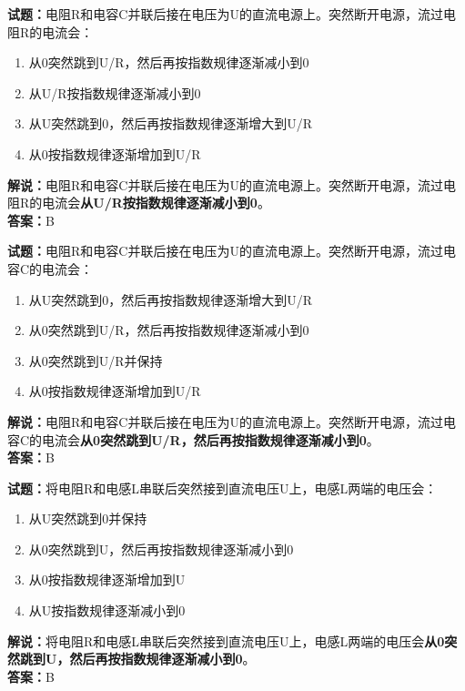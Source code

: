 \documentclass{ctexbook}
\begin{document}
\bigskip


\noindent\textbf{试题：}电阻R和电容C并联后接在电压为U的直流电源上。突然断开电源，流过电阻R的电流会：
\begin{enumerate}[leftmargin=3em]
\item 从0突然跳到U/R，然后再按指数规律逐渐减小到0
\item 从U/R按指数规律逐渐减小到0
\item 从U突然跳到0，然后再按指数规律逐渐增大到U/R
\item 从0按指数规律逐渐增加到U/R
\end{enumerate}
\noindent\textbf{解说：}电阻R和电容C并联后接在电压为U的直流电源上。突然断开电源，流过电阻R的电流会\textbf{从U/R按指数规律逐渐减小到0}。\\\noindent\textbf{答案：}B




\bigskip


\noindent\textbf{试题：}电阻R和电容C并联后接在电压为U的直流电源上。突然断开电源，流过电容C的电流会：
\begin{enumerate}[leftmargin=3em]
\item 从U突然跳到0，然后再按指数规律逐渐增大到U/R
\item 从0突然跳到U/R，然后再按指数规律逐渐减小到0
\item 从0突然跳到U/R并保持
\item 从0按指数规律逐渐增加到U/R
\end{enumerate}
\noindent\textbf{解说：}电阻R和电容C并联后接在电压为U的直流电源上。突然断开电源，流过电容C的电流会\textbf{从0突然跳到U/R，然后再按指数规律逐渐减小到0}。\\\noindent\textbf{答案：}B



\bigskip


\noindent\textbf{试题：}将电阻R和电感L串联后突然接到直流电压U上，电感L两端的电压会：
\begin{enumerate}[leftmargin=3em]
\item 从U突然跳到0并保持
\item 从0突然跳到U，然后再按指数规律逐渐减小到0
\item 从0按指数规律逐渐增加到U
\item 从U按指数规律逐渐减小到0
\end{enumerate}
\noindent\textbf{解说：}将电阻R和电感L串联后突然接到直流电压U上，电感L两端的电压会\textbf{从0突然跳到U，然后再按指数规律逐渐减小到0}。\\\noindent\textbf{答案：}B
\end{document}
